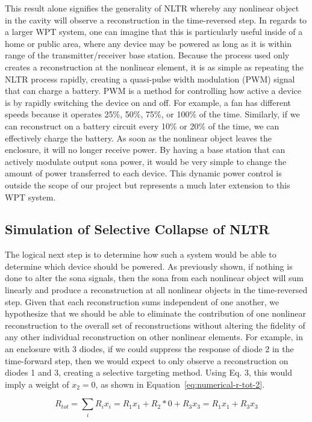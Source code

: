 This result alone signifies the generality of NLTR whereby any nonlinear object in the cavity will observe a reconstruction in the time-reversed step. In regards to a larger WPT system, one can imagine that this is particularly useful inside of a home or public area, where any device may be powered as long as it is within range of the transmitter/receiver base station. Because the process used only creates a reconstruction at the nonlinear element, it is as simple as repeating the NLTR process rapidly, creating a quasi-pulse width modulation (PWM) signal that can charge a battery. PWM is a method for controlling how active a device is by rapidly switching the device on and off. For example, a fan has different speeds because it operates 25\%, 50\%, 75\%, or 100\% of the time. Similarly, if we can reconstruct on a battery circuit every 10\% or 20\% of the time, we can effectively charge the battery. As soon as the nonlinear object leaves the enclosure, it will no longer receive power. By having a base station that can actively modulate output sona power, it would be very simple to change the amount of power transferred to each device. This dynamic power control is outside the scope of our project but represents a much later extension to this WPT system.

\subsection{Simulation of Selective Collapse of NLTR}
The logical next step is to determine how such a system would be able to determine which device should be powered. As previously shown, if nothing is done to alter the sona signals, then the sona from each nonlinear object will sum linearly and produce a reconstruction at all nonlinear objects in the time-reversed step. Given that each reconstruction sums independent of one another, we hypothesize that we should be able to eliminate the contribution of one nonlinear reconstruction to the overall set of reconstructions without altering the fidelity of any other individual reconstruction on other nonlinear elements. For example, in an enclosure with 3 diodes, if we could suppress the response of diode 2 in the time-forward step, then we would expect to only observe a reconstruction on diodes 1 and 3, creating a selective targeting method. Using Eq. 3, this would imply a weight of $x_{2} = 0$, as shown in Equation~\ref{eq:numerical-r-tot-2}.

\begin{equation}
R_{tot} = \sum_{i}R_{i}x_{i} = R_{1}x_{1} + R_{2}*0 + R_{3}x_{3} = R_{1}x_{1} + R_{3}x_{3}
\label{eq:numerical-r-tot-2}
\end{equation}

